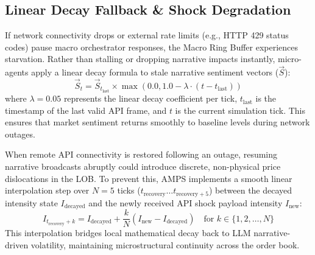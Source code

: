 \subsection{Linear Decay Fallback \& Shock Degradation}

If network connectivity drops or external rate limits (e.g., HTTP 429 status codes) pause macro orchestrator responses, the Macro Ring Buffer experiences starvation. Rather than stalling or dropping narrative impacts instantly, micro-agents apply a linear decay formula to stale narrative sentiment vectors ($\vec{S}$):
\begin{equation}
    \vec{S}_{t} = \vec{S}_{t_{\text{last}}} \times \max\left(0.0, 1.0 - \lambda \cdot (t - t_{\text{last}})\right)
\end{equation}
where $\lambda = 0.05$ represents the linear decay coefficient per tick, $t_{\text{last}}$ is the timestamp of the last valid API frame, and $t$ is the current simulation tick. This ensures that market sentiment returns smoothly to baseline levels during network outages.

When remote API connectivity is restored following an outage, resuming narrative broadcasts abruptly could introduce discrete, non-physical price dislocations in the LOB. To prevent this, AMPS implements a smooth linear interpolation step over $N = 5$ ticks ($t_{\text{recovery}} \dots t_{\text{recovery}+5}$) between the decayed intensity state $I_{\text{decayed}}$ and the newly received API shock payload intensity $I_{\text{new}}$:
\begin{equation}
    I_{t_{\text{recovery}} + k} = I_{\text{decayed}} + \frac{k}{N} \left( I_{\text{new}} - I_{\text{decayed}} \right) \quad \text{for } k \in \{1, 2, \dots, N\}
\end{equation}
This interpolation bridges local mathematical decay back to LLM narrative-driven volatility, maintaining microstructural continuity across the order book.

